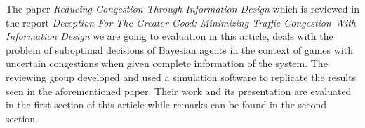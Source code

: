The paper \textit{Reducing Congestion Through Information Design} which is reviewed in the report \textit{Deception For The Greater Good: Minimizing Traffic Congestion With
Information Design} we are going to evaluation in this article, deals with the problem of suboptimal decisions of Bayesian agents in the context of games with uncertain congestions when given complete information of the system. The reviewing group developed and used a simulation software to replicate the results seen in the aforementioned paper. Their work and its presentation are evaluated in the first section of this article while remarks can be found in the second section.
